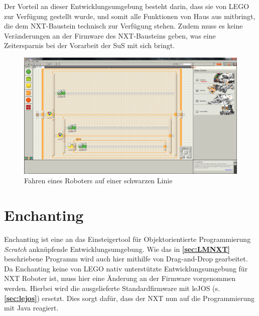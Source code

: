\documentclass[paper=a4, DIV=calc, BCOR=12mm, twoside=on, onecolumn=on, open = right, titlepage =on, parskip =half-, headsepline = on, footsepline = off, chapterprefix = off, appendixprefix = on, fontsize = 12pt, numbers = noenddot, abstract = on]{scrbook}
\begin{document}
Der Vorteil an dieser Entwicklungsumgebung besteht darin, dass sie von \textsc{LEGO} zur Verfügung gestellt wurde, und somit alle Funktionen von Haus aus mitbringt, die dem NXT-Baustein technisch zur Verfügung stehen. Zudem muss es keine Veränderungen an der Firmware des NXT-Bausteins geben, was eine Zeitersparnis bei der Vorarbeit der SuS mit sich bringt.

\begin{figure}[htbp]
\centering
\includegraphics[width=\textwidth]{images/Beispielprogramm_NXT.png} 
\caption{Fahren eines Roboters auf einer schwarzen Linie}
\label{fig:Bsp NXT}
\end{figure}

\vspace*{2ex}
\section{Enchanting}
\label{sec:enchanting}
Enchanting ist eine an das Einsteigertool für Objektorientierte Programmierung \emph{Scratch} anknüpfende Entwicklungsumgebung. Wie das in \textbf{\ref{sec:LMNXT}} beschriebene Programm wird auch hier mithilfe von Drag-and-Drop gearbeitet. Da Enchanting keine von LEGO nativ unterstützte Entwicklungsumgebung für NXT Roboter ist, muss hier eine Änderung an der Firmware vorgenommen werden. Hierbei wird die ausgelieferte Standardfirmware mit leJOS (s. \textbf{\ref{sec:lejos}}) ersetzt. Dies sorgt dafür, dass der NXT nun auf die Programmierung mit Java reagiert.
\end{document}
